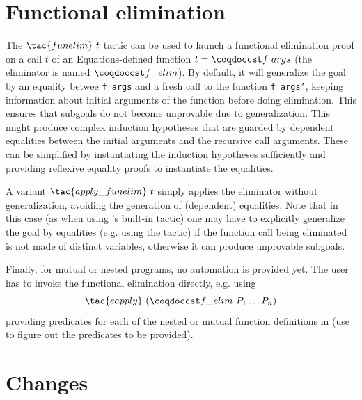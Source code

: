 \section{Functional elimination}

The $\tac{funelim}~t$ tactic can be used to launch a functional
elimination proof on a call $t$ of an Equations-defined function $t =
\cst{f}~args$ (the eliminator is named $\cst{f\_elim}$). By default, it will
generalize the goal by an equality betwee \texttt{f args} and a fresh
call to the function \texttt{f args'}, keeping information about initial
arguments of the function before doing elimination. This ensures that
subgoals do not become unprovable due to generalization. This might
produce complex induction hypotheses that are guarded by dependent
equalities between the initial arguments and the recursive call
arguments. These can be simplified by instantiating the induction
hypotheses sufficiently and providing reflexive equality proofs to
instantiate the equalities.

A variant $\tac{apply\_funelim}~t$ simply applies the
eliminator without generalization, avoiding the generation of
(dependent) equalities. Note that in this case (as when using \Coq's
built-in  tactic) one may have to explicitly
generalize the goal by equalities (e.g. using the 
tactic) if the function call being eliminated is not made of distinct
variables, otherwise it can produce unprovable subgoals.

Finally, for mutual or nested programs, no automation is provided yet.
The user has to invoke the functional elimination directly,
e.g. using \[\tac{eapply}~(\cst{f\_elim}~P_1 \ldots P_n)\] providing
predicates for each of the nested or mutual function definitions in
 (use   to figure out the predicates to be
provided).

\newpage
\section{Changes}

\def\issue#1{\href{https://github.com/rocq-prover/equations/issues/#1}{\texttt{\##1}}}

